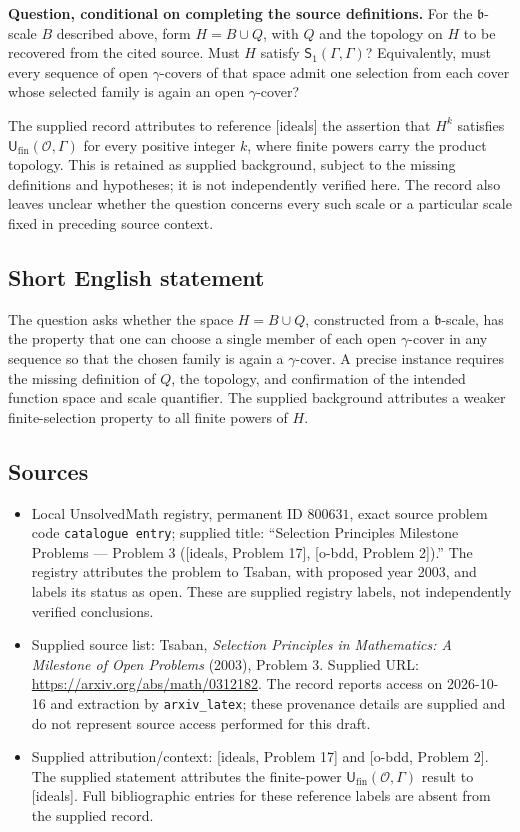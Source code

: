 \documentclass[11pt]{article}
\begin{document}
\textbf{Question, conditional on completing the source definitions.} For the \(\mathfrak b\)-scale \(B\) described above, form \(H=B\cup Q\), with \(Q\) and the topology on \(H\) to be recovered from the cited source. Must \(H\) satisfy \(\mathsf S_1(\Gamma,\Gamma)\)? Equivalently, must every sequence of open \(\gamma\)-covers of that space admit one selection from each cover whose selected family is again an open \(\gamma\)-cover?

The supplied record attributes to reference [ideals] the assertion that \(H^k\) satisfies \(\mathsf U_{\mathrm{fin}}(\mathcal O,\Gamma)\) for every positive integer \(k\), where finite powers carry the product topology. This is retained as supplied background, subject to the missing definitions and hypotheses; it is not independently verified here. The record also leaves unclear whether the question concerns every such scale or a particular scale fixed in preceding source context.
\subsection{Short English statement}
The question asks whether the space \(H=B\cup Q\), constructed from a \(\mathfrak b\)-scale, has the property that one can choose a single member of each open \(\gamma\)-cover in any sequence so that the chosen family is again a \(\gamma\)-cover. A precise instance requires the missing definition of \(Q\), the topology, and confirmation of the intended function space and scale quantifier. The supplied background attributes a weaker finite-selection property to all finite powers of \(H\).
\subsection{Sources}
\begin{itemize}
\item Local UnsolvedMath registry, permanent ID \(800631\), exact source problem code \texttt{catalogue entry}; supplied title: ``Selection Principles Milestone Problems --- Problem 3 ([ideals, Problem 17], [o-bdd, Problem 2]).'' The registry attributes the problem to Tsaban, with proposed year 2003, and labels its status as open. These are supplied registry labels, not independently verified conclusions.
\item Supplied source list: Tsaban, \emph{Selection Principles in Mathematics: A Milestone of Open Problems} (2003), Problem 3. Supplied URL: \url{https://arxiv.org/abs/math/0312182}. The record reports access on 2026-10-16 and extraction by \texttt{arxiv\_latex}; these provenance details are supplied and do not represent source access performed for this draft.
\item Supplied attribution/context: [ideals, Problem 17] and [o-bdd, Problem 2]. The supplied statement attributes the finite-power \(\mathsf U_{\mathrm{fin}}(\mathcal O,\Gamma)\) result to [ideals]. Full bibliographic entries for these reference labels are absent from the supplied record.
\end{itemize}
\end{document}
